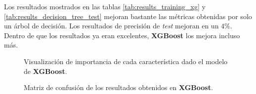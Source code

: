 \documentclass[12pt,letterpaper]{article}
\begin{document}
Los resultados mostrados en las tablas \ref{tab:results_training_xg} y \ref{tab:results_decision_tree_test} mejoran bastante las métricas obtenidas por solo un árbol de decisión. Los resultados de precisión de \textit{test} mejoran en un $4\%$. Dentro de que los resultados ya eran excelentes, \textbf{XGBoost} los mejora incluso más.

\begin{figure}[htp]
    \centering
    \caption{Visualización de importancia de cada característica dado el modelo de \textbf{XGBoost}.}
    \label{fig:feature_importance_xg}
\end{figure}

\begin{figure}[htp]
    \centering
    \caption{Matriz de confusión de los resultados obtenidos en \textbf{XGBoost}.}
    \label{fig:cm_decision_tree_xg}
\end{figure}
\end{document}
